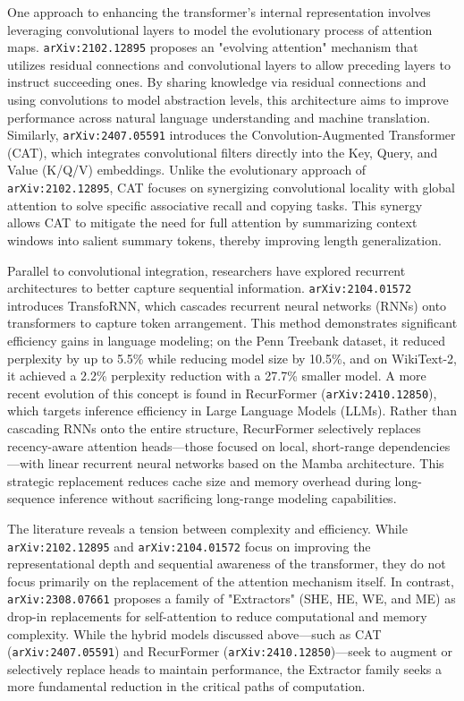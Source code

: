 \documentclass[11pt]{article}
\begin{document}
One approach to enhancing the transformer's internal representation involves leveraging convolutional layers to model the evolutionary process of attention maps. \texttt{arXiv:2102.12895} proposes an "evolving attention" mechanism that utilizes residual connections and convolutional layers to allow preceding layers to instruct succeeding ones. By sharing knowledge via residual connections and using convolutions to model abstraction levels, this architecture aims to improve performance across natural language understanding and machine translation. Similarly, \texttt{arXiv:2407.05591} introduces the Convolution-Augmented Transformer (CAT), which integrates convolutional filters directly into the Key, Query, and Value (K/Q/V) embeddings. Unlike the evolutionary approach of \texttt{arXiv:2102.12895}, CAT focuses on synergizing convolutional locality with global attention to solve specific associative recall and copying tasks. This synergy allows CAT to mitigate the need for full attention by summarizing context windows into salient summary tokens, thereby improving length generalization.

Parallel to convolutional integration, researchers have explored recurrent architectures to better capture sequential information. \texttt{arXiv:2104.01572} introduces TransfoRNN, which cascades recurrent neural networks (RNNs) onto transformers to capture token arrangement. This method demonstrates significant efficiency gains in language modeling; on the Penn Treebank dataset, it reduced perplexity by up to 5.5\% while reducing model size by 10.5\%, and on WikiText-2, it achieved a 2.2\% perplexity reduction with a 27.7\% smaller model. A more recent evolution of this concept is found in RecurFormer (\texttt{arXiv:2410.12850}), which targets inference efficiency in Large Language Models (LLMs). Rather than cascading RNNs onto the entire structure, RecurFormer selectively replaces recency-aware attention heads—those focused on local, short-range dependencies—with linear recurrent neural networks based on the Mamba architecture. This strategic replacement reduces cache size and memory overhead during long-sequence inference without sacrificing long-range modeling capabilities.

The literature reveals a tension between complexity and efficiency. While \texttt{arXiv:2102.12895} and \texttt{arXiv:2104.01572} focus on improving the representational depth and sequential awareness of the transformer, they do not focus primarily on the replacement of the attention mechanism itself. In contrast, \texttt{arXiv:2308.07661} proposes a family of "Extractors" (SHE, HE, WE, and ME) as drop-in replacements for self-attention to reduce computational and memory complexity. While the hybrid models discussed above—such as CAT (\texttt{arXiv:2407.05591}) and RecurFormer (\texttt{arXiv:2410.12850})—seek to augment or selectively replace heads to maintain performance, the Extractor family seeks a more fundamental reduction in the critical paths of computation.
\end{document}

